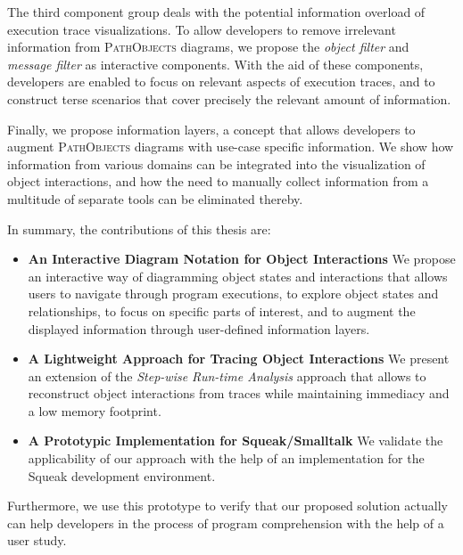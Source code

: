 The third component group deals with the potential information overload of execution trace visualizations.
To allow developers to remove irrelevant information from \textsc{PathObjects} diagrams, we propose the \emph{object filter} and \emph{message filter} as interactive components.
With the aid of these components, developers are enabled to focus on relevant aspects of execution traces, and to construct terse scenarios that cover precisely the relevant amount of information.

Finally, we propose information layers, a concept that allows developers to augment \textsc{PathObjects} diagrams with use-case specific information.
We show how information from various domains can be integrated into the visualization of object interactions, and how the need to manually collect information from a multitude of separate tools can be eliminated thereby.

In summary, the contributions of this thesis are:

\begin{itemize}
\renewcommand{\labelitemiv}{$\ast$}

\item \textbf{An Interactive Diagram Notation for Object Interactions} We propose an interactive way of diagramming object states and interactions that allows users to navigate through program executions, to explore object states and relationships, to focus on specific parts of interest, and to augment the displayed information through user-defined information layers.

\item \textbf{A Lightweight Approach for Tracing Object Interactions} We present an extension of the \emph{Step-wise Run-time Analysis} approach that allows to reconstruct object interactions from traces while maintaining immediacy and a low memory footprint.

\item \textbf{A Prototypic Implementation for Squeak/Smalltalk} We validate the applicability of our approach with the help of an implementation for the Squeak development environment.
\end{itemize}

Furthermore, we use this prototype to verify that our proposed solution actually can help developers in the process of program comprehension with the help of a user study. 

